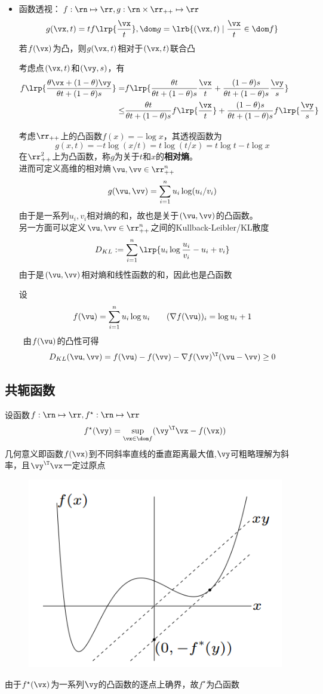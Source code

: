 \begin{itemize}
	\item 函数透视：$f:\rn\mapsto\rr,g:\rn\times\rr_{++}\mapsto\rr$
	\[g(\vx,t)=tf\lrp{\frac{\vx}{t}},\dom g=\lrb{(\vx,t)\mid\frac{\vx}{t}\in\dom f}\]
	若$f(\vx)$为凸，则$g(\vx,t)$相对于$(\vx,t)$联合凸
	\begin{analysis}
		考虑点$(\vx,t)$和$(\vy,s)$，有
		\[\begin{aligned}
		f\lrp{\frac{\theta\vx+(1-\theta)\vy}{\theta t+(1-\theta)s}}
		=&f\lrp{\frac{\theta t}{\theta t+(1-\theta)s}\frac{\vx}{t}+\frac{(1-\theta) s}{\theta t+(1-\theta)s}\frac{\vy}{s}}\\
		\leq&\frac{\theta t}{\theta t+(1-\theta)s}f\lrp{\frac{\vx}{t}}+\frac{(1-\theta) s}{\theta t+(1-\theta)s}f\lrp{\frac{\vy}{s}}
		\end{aligned}\]
	\end{analysis}
	\begin{example}
		考虑$\rr_{++}$上的凸函数$f(x)=-\log x$，其透视函数为
		\[g(x,t)=-t\log(x/t)=t\log(t/x)=t\log t-t\log x\]
		在$\rr_{++}^2$上为凸函数，称$g$为关于$t$和$x$的\textbf{相对熵}。
		\\进而可定义高维的相对熵$\vu,\vv\in\rr_{++}^n$
		\[g(\vu,\vv)=\sum_{i=1}^n u_i\log(u_i/v_i)\]
		由于是一系列$u_i,v_i$相对熵的和，故也是关于$(\vu,\vv)$的凸函数。
		\\另一方面可以定义$\vu,\vv\in\rr_{++}^n$之间的Kullback-Leibler/KL散度
		\[D_{KL}:=\sum_{i=1}^n\lrp{u_i\log\frac{u_i}{v_i}-u_i+v_i}\]
		由于是$(\vu,\vv)$相对熵和线性函数的和，因此也是凸函数
	\end{example}
	\begin{analysis}
		设
		\[f(\vu)=\sum_{i=1}^n u_i\log u_i \qquad (\nabla f(\vu))_i=\log u_i+1\]\
		由$f(\vu)$的凸性可得
		\[D_{KL}(\vu,\vv)=f(\vu)-f(\vv)-\nabla f(\vv)^\T(\vu-\vv)\geq 0\]
	\end{analysis}
\end{itemize}

\subsection{共轭函数}
\begin{definition}
	设函数$f:\rn\mapsto\rr,f^\star:\rn\mapsto\rr$
	\[f^\star(\vy)=\sup_{\vx\in\dom f}(\vy^\T \vx-f(\vx))\]
	几何意义即函数$f(\vx)$到不同斜率直线的垂直距离最大值,$\vy$可粗略理解为斜率，且$\vy^\T\vx$一定过原点
	\begin{figure}[H]
		\centering
		\includegraphics[width=0.4\linewidth]{fig/conjugate.PNG}
	\end{figure}
\end{definition}
由于$f^\star(\vx)$为一系列$\vy$的凸函数的逐点上确界，故$f^\star$为凸函数

